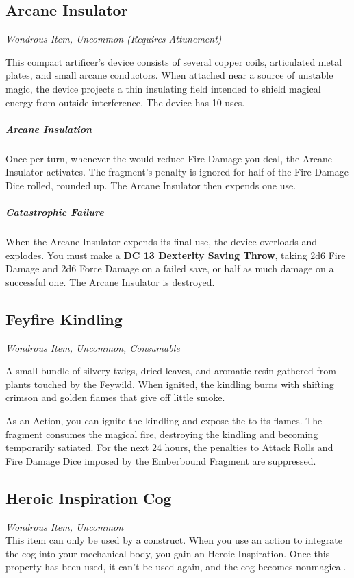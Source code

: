 \subsection*{Arcane Insulator}\label{mi:ArcaneInsulator}
\textit{Wondrous Item, Uncommon (Requires Attunement)}\\
{\entryfont This compact artificer's device consists of several copper coils, articulated metal plates, and small arcane conductors. When attached near a source of unstable magic, the device projects a thin insulating field intended to shield magical energy from outside interference. The device has 10 uses.

\subparagraph*{Arcane Insulation} Once per turn, whenever the \hyperref[mi:EmberboundFragment]{} would reduce Fire Damage you deal, the Arcane Insulator activates. The fragment's penalty is ignored for half of the Fire Damage Dice rolled, rounded up. The Arcane Insulator then expends one use.

\subparagraph*{Catastrophic Failure} When the Arcane Insulator expends its final use, the device overloads and explodes. You must make a \textbf{DC 13 Dexterity Saving Throw}, taking 2d6 Fire Damage and 2d6 Force Damage on a failed save, or half as much damage on a successful one. The Arcane Insulator is destroyed.}

\subsection*{Feyfire Kindling}\label{mi:FeyfireKindling}
\textit{Wondrous Item, Uncommon, Consumable}\\
{\entryfont A small bundle of silvery twigs, dried leaves, and aromatic resin gathered from plants touched by the Feywild. When ignited, the kindling burns with shifting crimson and golden flames that give off little smoke.

As an Action, you can ignite the kindling and expose the \hyperref[mi:EmberboundFragment]{} to its flames. The fragment consumes the magical fire, destroying the kindling and becoming temporarily satiated. For the next 24 hours, the penalties to Attack Rolls and Fire Damage Dice imposed by the Emberbound Fragment are suppressed.}

\subsection*{Heroic Inspiration Cog}\label{mi:HeroicInspirationCog}
\textit{Wondrous Item, Uncommon}\\
{\entryfont This item can only be used by a construct. When you use an action to integrate the cog into your mechanical body, you gain an Heroic Inspiration. Once this property has been used, it can't be used again, and the cog becomes nonmagical.}

